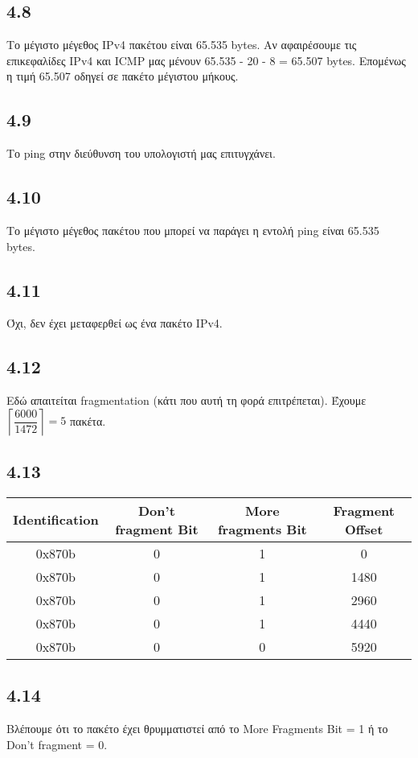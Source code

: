 		\subsection*{4.8}
			Το μέγιστο μέγεθος IPv4 πακέτου είναι 65.535 bytes. Αν αφαιρέσουμε τις επικεφαλίδες IPv4 και ICMP μας μένουν 65.535 - 20 - 8 = 65.507 bytes. Επομένως η τιμή 65.507 οδηγεί σε πακέτο μέγιστου μήκους.

		\subsection*{4.9}
			Το ping στην διεύθυνση του υπολογιστή μας επιτυγχάνει.

		\subsection*{4.10}
			Το μέγιστο μέγεθος πακέτου που μπορεί να παράγει η εντολή ping είναι 65.535 bytes.

		\subsection*{4.11}
			Όχι, δεν έχει μεταφερθεί ως ένα πακέτο IPv4.

		\subsection*{4.12}
			Εδώ απαιτείται fragmentation (κάτι που αυτή τη φορά επιτρέπεται). Έχουμε $\left\lceil \dfrac{6000}{1472} \right\rceil = 5$ πακέτα. 

		\subsection*{4.13}
			\begin{tabular}{|c|c|c|c|}
				\hline
				Identification & Don't fragment Bit & More fragments Bit & Fragment Offset \\
				\hline
				\hline				
				0x870b & 0 & 1 & 0 \\ 
				\hline
				0x870b & 0 & 1 & 1480 \\
				\hline
				0x870b & 0 & 1 & 2960 \\
				\hline
				0x870b & 0 & 1 & 4440 \\
				\hline
				0x870b & 0 & 0 & 5920 \\
				\hline
			\end{tabular}

		\subsection*{4.14}
			Βλέπουμε ότι το πακέτο έχει θρυμματιστεί από το More Fragments Bit = 1 ή το Don't fragment = 0.

